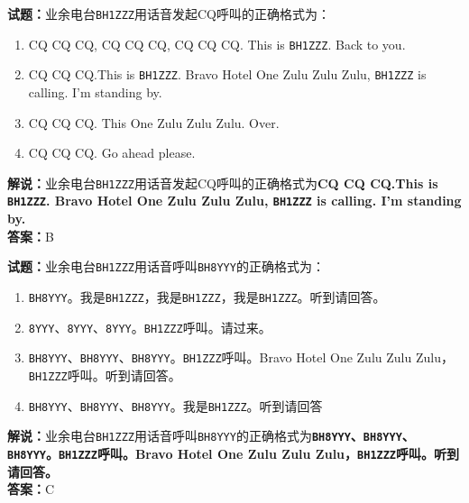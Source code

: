 \documentclass{ctexbook}
\begin{document}
\bigskip

\noindent\textbf{试题：}业余电台\texttt{BH1ZZZ}用话音发起CQ呼叫的正确格式为：
\begin{enumerate}[leftmargin=3em]
  \item CQ CQ CQ, CQ CQ CQ, CQ CQ CQ. This is \texttt{BH1ZZZ}. Back to you.
  \item CQ CQ CQ.This is \texttt{BH1ZZZ}. Bravo Hotel One Zulu Zulu Zulu, \texttt{BH1ZZZ} is calling. I’m standing by.
  \item CQ CQ CQ. This One Zulu Zulu Zulu. Over.
  \item CQ CQ CQ. Go ahead please.
\end{enumerate}
\noindent\textbf{解说：}业余电台\texttt{BH1ZZZ}用话音发起CQ呼叫的正确格式为\textbf{CQ CQ CQ.This is \texttt{BH1ZZZ}. Bravo Hotel One Zulu Zulu Zulu, \texttt{BH1ZZZ} is calling. I’m standing by.}\cite{icao}\cite[49]{yeyuwuxiandiantongxin}\\
\noindent\textbf{答案：}B

\bigskip

\noindent\textbf{试题：}业余电台\texttt{BH1ZZZ}用话音呼叫\texttt{BH8YYY}的正确格式为：
\begin{enumerate}[leftmargin=3em]
  \item \texttt{BH8YYY}。我是\texttt{BH1ZZZ}，我是\texttt{BH1ZZZ}，我是\texttt{BH1ZZZ}。听到请回答。
  \item \texttt{8YYY}、\texttt{8YYY}、\texttt{8YYY}。\texttt{BH1ZZZ}呼叫。请过来。
  \item \texttt{BH8YYY}、\texttt{BH8YYY}、\texttt{BH8YYY}。\texttt{BH1ZZZ}呼叫。Bravo Hotel One Zulu Zulu Zulu，\texttt{BH1ZZZ}呼叫。听到请回答。
  \item \texttt{BH8YYY}、\texttt{BH8YYY}、\texttt{BH8YYY}。我是\texttt{BH1ZZZ}。听到请回答
\end{enumerate}
\noindent\textbf{解说：}业余电台\texttt{BH1ZZZ}用话音呼叫\texttt{BH8YYY}的正确格式为\textbf{\texttt{BH8YYY}、\texttt{BH8YYY}、\texttt{BH8YYY}。\texttt{BH1ZZZ}呼叫。Bravo Hotel One Zulu Zulu Zulu，\texttt{BH1ZZZ}呼叫。听到请回答。}\cite{icao}\cite[49]{yeyuwuxiandiantongxin}\\
\noindent\textbf{答案：}C

\bigskip
\end{document}
